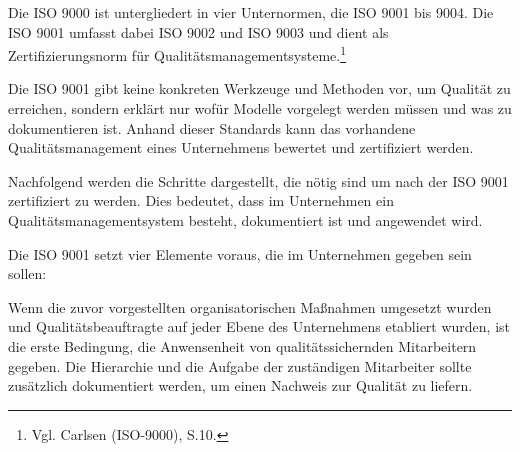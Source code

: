            Die ISO 9000 ist untergliedert in vier Unternormen, die ISO 9001 bis 9004. Die ISO 9001 umfasst dabei ISO 9002 und ISO 9003 und dient als Zertifizierungsnorm für Qualitätsmanagementsysteme.\footnote{Vgl. Carlsen (ISO-9000), S.10.}

            Die ISO 9001 gibt keine konkreten Werkzeuge und Methoden vor, um Qualität zu erreichen, sondern erklärt nur wofür Modelle vorgelegt werden müssen und was zu dokumentieren ist. Anhand dieser Standards kann das vorhandene Qualitätsmanagement eines Unternehmens bewertet und zertifiziert werden.

            Nachfolgend werden die Schritte dargestellt, die nötig sind um nach der ISO 9001 zertifiziert zu werden. Dies bedeutet, dass im Unternehmen ein Qualitätsmanagementsystem besteht, dokumentiert ist und angewendet wird.

            Die ISO 9001 setzt vier Elemente voraus, die im Unternehmen gegeben sein sollen:

            Wenn die zuvor vorgestellten organisatorischen Maßnahmen umgesetzt wurden und Qualitätsbeauftragte auf jeder Ebene des Unternehmens etabliert wurden, ist die erste Bedingung, die Anwensenheit von qualitätssichernden Mitarbeitern gegeben. Die Hierarchie und die Aufgabe der zuständigen Mitarbeiter sollte zusätzlich dokumentiert werden, um einen Nachweis zur Qualität zu liefern.

